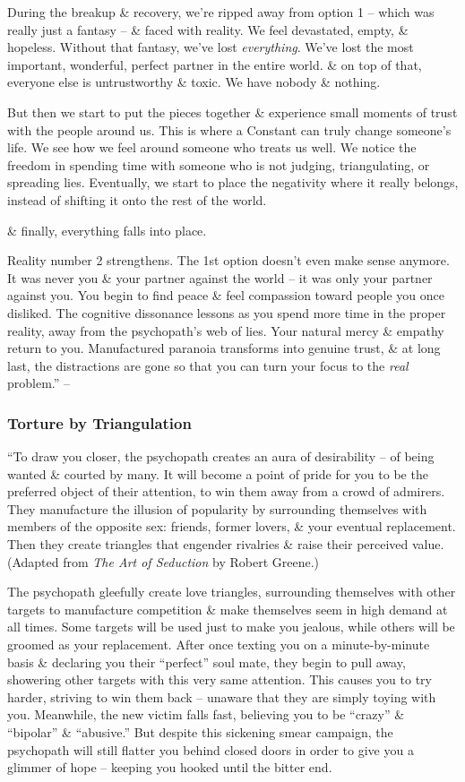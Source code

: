 \documentclass{article}
\numberwithin{equation}{section}
\begin{document}
During the breakup \& recovery, we're ripped away from option 1 -- which was really just a fantasy -- \& faced with reality. We feel devastated, empty, \& hopeless. Without that fantasy, we've lost \textit{everything}. We've lost the most important, wonderful, perfect partner in the entire world. \& on top of that, everyone else is untrustworthy \& toxic. We have nobody \& nothing.

But then we start to put the pieces together \& experience small moments of trust with the people around us. This is where a Constant can truly change someone's life. We see how we feel around someone who treats us well. We notice the freedom in spending time with someone who is not judging, triangulating, or spreading lies. Eventually, we start to place the negativity where it really belongs, instead of shifting it onto the rest of the world.

\& finally, everything falls into place.

Reality number 2 strengthens. The 1st option doesn't even make sense anymore. It was never you \& your partner against the world -- it was only your partner against you. You begin to find peace \& feel compassion toward people you once disliked. The cognitive dissonance lessons as you spend more time in the proper reality, away from the psychopath's web of lies. Your natural mercy \& empathy return to you. Manufactured paranoia transforms into genuine trust, \& at long last, the distractions are gone so that you can turn your focus to the \textit{real} problem.'' -- \cite[pp. 59--61]{MacKenzie2015}

\subsubsection{Torture by Triangulation}
``To draw you closer, the psychopath creates an aura of desirability -- of being wanted \& courted by many. It will become a point of pride for you to be the preferred object of their attention, to win them away from a crowd of admirers. They manufacture the illusion of popularity by surrounding themselves with members of the opposite sex: friends, former lovers, \& your eventual replacement. Then they create triangles that engender rivalries \& raise their perceived value. (Adapted from \textit{The Art of Seduction} by Robert Greene.)

The psychopath gleefully create love triangles, surrounding themselves with other targets to manufacture competition \& make themselves seem in high demand at all times. Some targets will be used just to make you jealous, while others will be groomed as your replacement. After once texting you on a minute-by-minute basis \& declaring you their ``perfect'' soul mate, they begin to pull away, showering other targets with this very same attention. This causes you to try harder, striving to win them back -- unaware that they are simply toying with you. Meanwhile, the new victim falls fast, believing you to be ``crazy'' \& ``bipolar'' \& ``abusive.'' But despite this sickening smear campaign, the psychopath will still flatter you behind closed doors in order to give you a glimmer of hope -- keeping you hooked until the bitter end.
\end{document}
